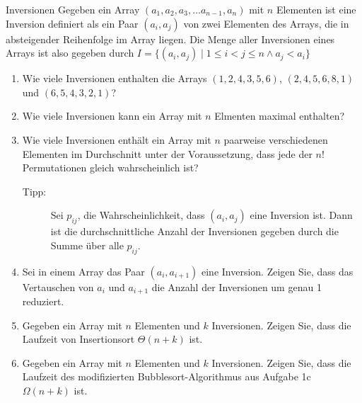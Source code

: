 \documentclass[11pt,a4paper]{article}
\begin{document}

\begin{aufgabe}{3}{Inversionen}
    Gegeben ein Array $(a_1, a_2, a_3, \ldots a_{n - 1}, a_n)$ mit $n$ Elementen ist eine Inversion definiert als ein Paar $(a_i, a_j)$ von zwei Elementen des Arrays, die in absteigender Reihenfolge im Array liegen.
    Die Menge aller Inversionen eines Arrays ist also gegeben durch $I = \{(a_i, a_j) \mid 1 \leq i < j \leq n \wedge a_j  < a_i \}$
    \begin{enumerate}
        \item Wie viele Inversionen enthalten die Arrays $(1, 2, 4, 3, 5, 6)$, $(2, 4, 5, 6, 8, 1)$ und $(6, 5, 4, 3, 2, 1)$?

        \item Wie viele Inversionen kann ein Array mit $n$ Elmenten maximal enthalten?

        \item Wie viele Inversionen enthält ein Array mit $n$ paarweise verschiedenen Elementen im Durchschnitt unter der Voraussetzung, dass jede der $n!$ Permutationen gleich wahrscheinlich ist?
        \begin{description}
            \item[Tipp:] Sei $p_{ij}$, die Wahrscheinlichkeit, dass $(a_i, a_j)$ eine Inversion ist. Dann ist die durchschnittliche Anzahl der Inversionen gegeben durch die Summe über alle $p_{ij}$.
        \end{description}

        \item Sei in einem Array das Paar $(a_i, a_{i + 1})$ eine Inversion. Zeigen Sie, dass das Vertauschen von $a_i$ und $a_{i + 1}$ die Anzahl der Inversionen um genau 1 reduziert.
        
        \item Gegeben ein Array mit $n$ Elementen und $k$ Inversionen. Zeigen Sie, dass die Laufzeit von Insertionsort $\Theta(n + k)$ ist.

        \item Gegeben ein Array mit $n$ Elementen und $k$ Inversionen. Zeigen Sie, dass die Laufzeit des modifizierten Bubblesort-Algorithmus aus Aufgabe 1c $\Omega(n + k)$ ist.
    \end{enumerate}
\end{aufgabe}
\end{document}
